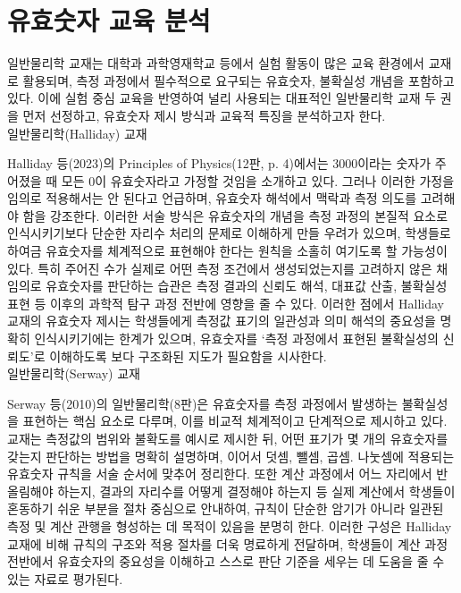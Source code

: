\section{유효숫자 교육 분석}
\ganadareset

일반물리학 교재는 대학과 과학영재학교 등에서 실험 활동이 많은 교육 환경에서 교재로 활용되며,
측정 과정에서 필수적으로 요구되는 유효숫자, 불확실성 개념을 포함하고 있다.
%
이에 실험 중심 교육을 반영하여 널리 사용되는 대표적인 일반물리학 교재 두 권을 먼저 선정하고,
유효숫자 제시 방식과 교육적 특징을 분석하고자 한다. \\

\ganada 일반물리학(Halliday) 교재

Halliday 등(2023)의 Principles of Physics(12판, p. 4)에서는
3000이라는 숫자가 주어졌을 때 모든 0이 유효숫자라고 가정할 것임을 소개하고 있다.
%
그러나 이러한 가정을 임의로 적용해서는 안 된다고 언급하며,
유효숫자 해석에서 맥락과 측정 의도를 고려해야 함을 강조한다.
%
이러한 서술 방식은 유효숫자의 개념을 측정 과정의 본질적 요소로 인식시키기보다
단순한 자리수 처리의 문제로 이해하게 만들 우려가 있으며,
학생들로 하여금 유효숫자를 체계적으로 표현해야 한다는 원칙을 소홀히 여기도록 할 가능성이 있다.
%
특히 주어진 수가 실제로 어떤 측정 조건에서 생성되었는지를 고려하지 않은 채 임의로
유효숫자를 판단하는 습관은 측정 결과의 신뢰도 해석, 대표값 산출, 불확실성 표현 등
이후의 과학적 탐구 과정 전반에 영향을 줄 수 있다.
%
이러한 점에서 Halliday 교재의 유효숫자 제시는 학생들에게 측정값 표기의 일관성과
의미 해석의 중요성을 명확히 인식시키기에는 한계가 있으며,
유효숫자를 `측정 과정에서 표현된 불확실성의 신뢰도'로 이해하도록 보다 구조화된 지도가 필요함을 시사한다. \\

\ganada 일반물리학(Serway) 교재

Serway 등(2010)의 일반물리학(8판)은 유효숫자를 측정 과정에서 발생하는 불확실성을
표현하는 핵심 요소로 다루며, 이를 비교적 체계적이고 단계적으로 제시하고 있다.
%
교재는 측정값의 범위와 불확도를 예시로 제시한 뒤, 어떤 표기가 몇 개의 유효숫자를 갖는지 판단하는 방법을
명확히 설명하며, 이어서 덧셈, 뺄셈, 곱셈. 나눗셈에 적용되는 유효숫자 규칙을 서술 순서에 맞추어 정리한다.
%
또한 계산 과정에서 어느 자리에서 반올림해야 하는지, 결과의 자리수를 어떻게 결정해야 하는지 등
실제 계산에서 학생들이 혼동하기 쉬운 부분을 절차 중심으로 안내하여,
규칙이 단순한 암기가 아니라 일관된 측정 및 계산 관행을 형성하는 데 목적이 있음을 분명히 한다.
%
이러한 구성은 Halliday 교재에 비해 규칙의 구조와 적용 절차를 더욱 명료하게 전달하며,
학생들이 계산 과정 전반에서 유효숫자의 중요성을 이해하고 스스로 판단 기준을 세우는 데
도움을 줄 수 있는 자료로 평가된다. \\

